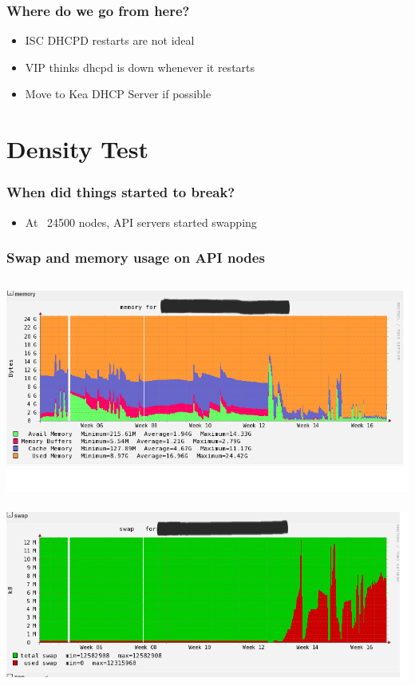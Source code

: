 \documentclass[aspectratio=169,11pt,hyperref={colorlinks=true}]{beamer}
\begin{document}
\begin{frame}
    \frametitle{Where do we go from here?}
    \begin{itemize}[<+-| alert@+>]
        \item ISC DHCPD restarts are not ideal
        \item VIP thinks dhcpd is down whenever it restarts
        \item Move to Kea DHCP Server if possible
    \end{itemize}
\end{frame}

\section{Density Test}
\begin{frame}
    \frametitle{When did things started to break?}
    \begin{itemize}
        \item At ~24500 nodes, API servers started swapping
    \end{itemize}
\end{frame}

\begin{frame}
    \frametitle{Swap and memory usage on API nodes}
    \begin{columns}[t]
    \centering
        \includegraphics[scale=0.30]{logos/mem_api.png}\ \includegraphics[scale=0.30]{logos/swap_api.png}
    \end{columns}
\end{frame}
\end{document}
